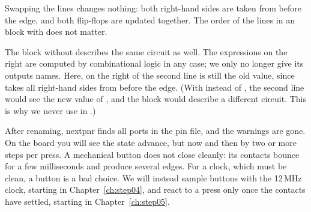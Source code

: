 \solutions

\solution
Swapping the lines changes nothing: both right-hand sides are taken from before
the edge, and both flip-flops are updated together. The order of the lines in
an  block with \cc{<=} does not matter.

The block without  describes the same circuit as well. The
expressions on the right are computed by combinational logic in any case; we
only no longer give its outputs names. Here,  on the right of the second
line is still the old value, since \cc{<=} takes all right-hand sides from
before the edge. (With \cc{=} instead of \cc{<=}, the second line would see the
new value of , and the block would describe a different circuit. This
is why we never use \cc{=} in .)

\solution
After renaming, nextpnr finds all ports in the pin file, and the warnings are
gone. On the board you will see the state advance, but now and then by two or
more steps per press. A mechanical button does not close cleanly: its
contacts bounce for a few milliseconds and produce several edges. For a clock,
which must be clean, a button is a bad choice. We will instead sample buttons
with the 12\,MHz clock, starting in Chapter~\ref{ch:step04}, and react to a
press only once the contacts have settled, starting in
Chapter~\ref{ch:step05}.
